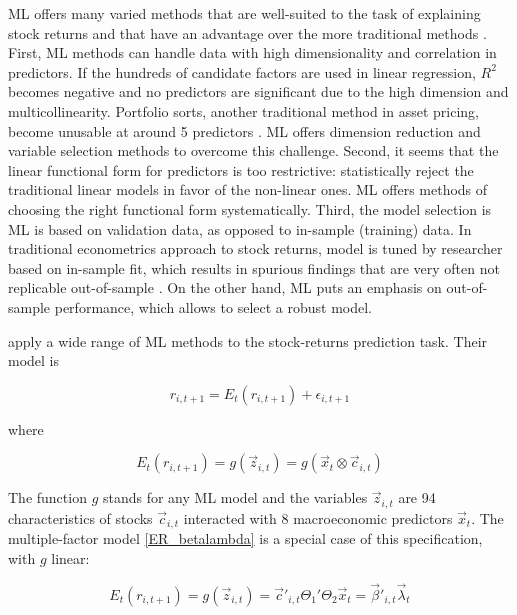 		ML offers many varied methods that are well-suited to the task of explaining stock returns and that have an advantage over the more traditional methods \citep{gu2020empirical}. First, ML methods can handle data with high dimensionality and correlation in predictors. If the hundreds of candidate factors are used in linear regression, $R^2$ becomes negative and no predictors are significant \citep{gu2020empirical} due to the high dimension and multicollinearity. Portfolio sorts, another traditional method in asset pricing, become unusable at around 5 predictors \cite{cochrane2011presidential, bryzgalova2019forest}. ML offers dimension reduction and variable selection methods to overcome this challenge. Second, it seems that the linear functional form for predictors is too restrictive: \cite{gu2020empirical} statistically reject the traditional linear models in favor of the non-linear ones. ML offers methods of choosing the right functional form systematically. Third, the model selection is ML is based on validation data, as opposed to in-sample (training) data. In traditional econometrics approach to stock returns, model is tuned by researcher based on in-sample fit, which results in spurious findings that are very often not replicable out-of-sample \citep{mclean2016does}. On the other hand, ML puts an emphasis on out-of-sample performance, which allows to select a robust model.   	
	
		\cite{gu2020empirical} apply a wide range of ML methods to the stock-returns prediction task. Their model is 
		
		\begin{equation}
		r_{i, t+1} = E_t(r_{i,t+1}) + \epsilon_{i,t+1}
		\end{equation}
		
		where 
		
		\begin{equation}
		E_t(r_{i,t+1}) = g(\vec{z}_{i,t}) = g(\vec{x}_t \otimes \vec{c}_{i,t})
		\end{equation}
		
	
		The function $g$ stands for any ML model and the variables $\vec{z}_{i,t}$ are 94 characteristics of stocks $ \vec{c}_{i,t}$ interacted with 8 macroeconomic predictors $\vec{x}_t$. The multiple-factor model \ref{ER_betalambda} is a special case of this specification, with $g$ linear: 
		
		\begin{equation}
			E_t(r_{i,t+1}) = g(\vec{z}_{i,t}) = \vec{c}'_{i,t}\Theta_1'\Theta_2 \vec{x}_t = \vec{{\beta}}'_{i,t} \vec{\lambda}_{t}
		\end{equation}
		
